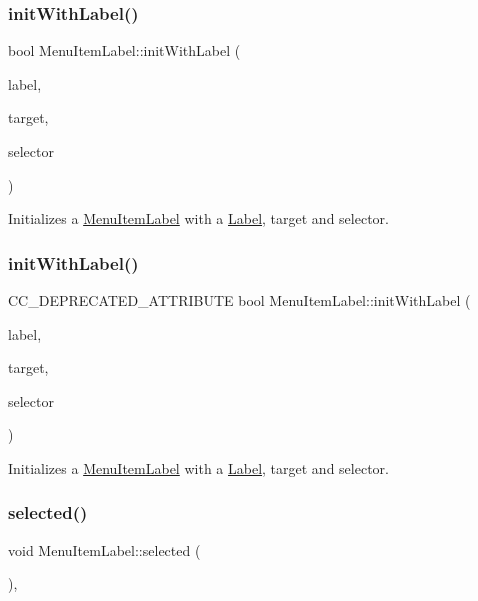 \subsubsection{\texorpdfstring{init\+With\+Label()}{initWithLabel()}\hspace{0.1cm}{\footnotesize\ttfamily [3/4]}}
{\footnotesize\ttfamily bool Menu\+Item\+Label\+::init\+With\+Label (\begin{DoxyParamCaption}\item[{\hyperlink{classNode}{Node} $\ast$}]{label,  }\item[{\hyperlink{classRef}{Ref} $\ast$}]{target,  }\item[{S\+E\+L\+\_\+\+Menu\+Handler}]{selector }\end{DoxyParamCaption})}

Initializes a \hyperlink{classMenuItemLabel}{Menu\+Item\+Label} with a \hyperlink{classLabel}{Label}, target and selector. \mbox{\label{classMenuItemLabel_a32ea4cd25efc973bc0452e62c2100c75}} 
\subsubsection{\texorpdfstring{init\+With\+Label()}{initWithLabel()}\hspace{0.1cm}{\footnotesize\ttfamily [4/4]}}
{\footnotesize\ttfamily C\+C\+\_\+\+D\+E\+P\+R\+E\+C\+A\+T\+E\+D\+\_\+\+A\+T\+T\+R\+I\+B\+U\+TE bool Menu\+Item\+Label\+::init\+With\+Label (\begin{DoxyParamCaption}\item[{\hyperlink{classNode}{Node} $\ast$}]{label,  }\item[{\hyperlink{classRef}{Ref} $\ast$}]{target,  }\item[{S\+E\+L\+\_\+\+Menu\+Handler}]{selector }\end{DoxyParamCaption})}

Initializes a \hyperlink{classMenuItemLabel}{Menu\+Item\+Label} with a \hyperlink{classLabel}{Label}, target and selector. \mbox{\label{classMenuItemLabel_aabdccb0d37847efa1a0ba0f717dcee30}} 
\subsubsection{\texorpdfstring{selected()}{selected()}\hspace{0.1cm}{\footnotesize\ttfamily [1/2]}}
{\footnotesize\ttfamily void Menu\+Item\+Label\+::selected (\begin{DoxyParamCaption}{ }\end{DoxyParamCaption})\hspace{0.3cm}{\ttfamily [override]}, {\ttfamily [virtual]}}

